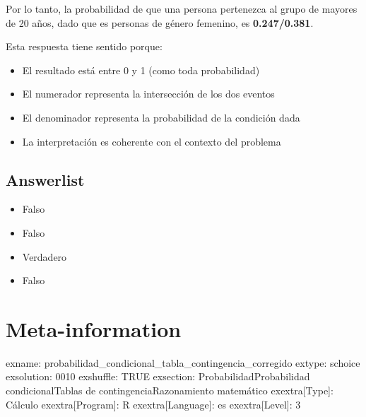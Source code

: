 \documentclass[
]{article}
\providecommand{\tightlist}{%
  \setlength{\itemsep}{0pt}\setlength{\parskip}{0pt}}
\begin{document}
Por lo tanto, la probabilidad de que una persona pertenezca al grupo de
mayores de 20 años, dado que es personas de género femenino, es
\textbf{0.247/0.381}.

Esta respuesta tiene sentido porque:

\begin{itemize}
\tightlist
\item
  El resultado está entre 0 y 1 (como toda probabilidad)
\item
  El numerador representa la intersección de los dos eventos
\item
  El denominador representa la probabilidad de la condición dada
\item
  La interpretación es coherente con el contexto del problema
\end{itemize}

\subsection{Answerlist}\label{answerlist-1}

\begin{itemize}
\tightlist
\item
  Falso
\item
  Falso
\item
  Verdadero
\item
  Falso
\end{itemize}

\section{Meta-information}\label{meta-information}

exname: probabilidad\_condicional\_tabla\_contingencia\_corregido
extype: schoice exsolution: 0010 exshuffle: TRUE exsection:
Probabilidad\textbar Probabilidad condicional\textbar Tablas de
contingencia\textbar Razonamiento matemático exextra{[}Type{]}: Cálculo
exextra{[}Program{]}: R exextra{[}Language{]}: es exextra{[}Level{]}: 3
\end{document}
